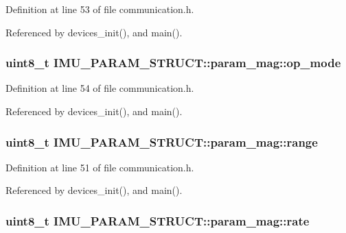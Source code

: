 Definition at line 53 of file communication.\-h.



Referenced by devices\-\_\-init(), and main().

\hypertarget{structIMU__PARAM__STRUCT_1_1param__mag_a39b83b3e9ff5bdcafed0bdf6a2de584b}{
\subsubsection[{op\-\_\-mode}]{\setlength{\rightskip}{0pt plus 5cm}uint8\-\_\-t I\-M\-U\-\_\-\-P\-A\-R\-A\-M\-\_\-\-S\-T\-R\-U\-C\-T\-::param\-\_\-mag\-::op\-\_\-mode}}\label{structIMU__PARAM__STRUCT_1_1param__mag_a39b83b3e9ff5bdcafed0bdf6a2de584b}


Definition at line 54 of file communication.\-h.



Referenced by devices\-\_\-init(), and main().

\hypertarget{structIMU__PARAM__STRUCT_1_1param__mag_a40ad27ebdb5fde35257b1dc52e40f476}{
\subsubsection[{range}]{\setlength{\rightskip}{0pt plus 5cm}uint8\-\_\-t I\-M\-U\-\_\-\-P\-A\-R\-A\-M\-\_\-\-S\-T\-R\-U\-C\-T\-::param\-\_\-mag\-::range}}\label{structIMU__PARAM__STRUCT_1_1param__mag_a40ad27ebdb5fde35257b1dc52e40f476}


Definition at line 51 of file communication.\-h.



Referenced by devices\-\_\-init(), and main().

\hypertarget{structIMU__PARAM__STRUCT_1_1param__mag_a234de95423b604b05b851ef90890cea1}{
\subsubsection[{rate}]{\setlength{\rightskip}{0pt plus 5cm}uint8\-\_\-t I\-M\-U\-\_\-\-P\-A\-R\-A\-M\-\_\-\-S\-T\-R\-U\-C\-T\-::param\-\_\-mag\-::rate}}\label{structIMU__PARAM__STRUCT_1_1param__mag_a234de95423b604b05b851ef90890cea1}


